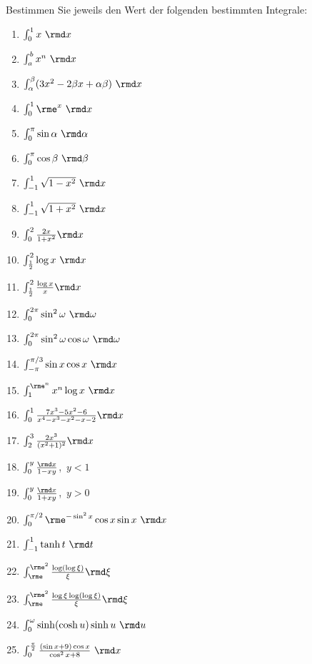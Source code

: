 \documentclass[11pt,answers]{exam}
\begin{document}
\begin{questions}

Bestimmen Sie jeweils den Wert der folgenden bestimmten Integrale:\\
\parbox{0.5\textwidth}{\begin{enumerate}
\item $\int_0^1 x~\rmd x$  
\item $\int_a^b x^n~\rmd x$
\item $\int_\alpha^\beta (3x^2-2\beta x+\alpha\beta)~\rmd x$  
\item $\int_0^1 \rme^x~\rmd x$ 
\item $\int_0^\pi \sin\alpha~\rmd\alpha$  
\item $\int_0^\pi \cos\beta~\rmd\beta$  
\item $\int_{-1}^1\sqrt{1-x^2}~\rmd x$  
\item $\int_{-1}^1\sqrt{1+x^2}~\rmd x$  
\item $\int_0^2 \frac{2x}{1+x^2}\rmd x$  
\item $\int_{\frac{1}{2}}^2\log x~\rmd x$  
\item $\int_{\frac{1}{2}}^2\frac{\log x}{x}\rmd x$  
\item $\int_0^{2\pi}\sin^2\omega~\rmd\omega$  
\item $\int_0^{2\pi}\sin^2\omega\cos\omega~\rmd\omega$  
\end{enumerate}}\parbox{0.5\textwidth}{\begin{enumerate}\setcounter{enumi}{13}
\item $\int_{-\pi}^{\pi/3}\sin x\cos x~\rmd x$  
\item $\int_1^{\rme^n} x^n\log x~\rmd x$  
\item $\int_0^1 \frac{7 x^3-5 x^2-6}{x^4-x^3-x^2-x-2}\rmd x$  
\item $\int_2^3 \frac{2 x^3}{(x^2+1)^2}\rmd x$  
\item $\int_0^y \frac{\rmd x}{1-xy}$,~$y<1$
\item $\int_0^y \frac{\rmd x}{1+xy}$,~$y>0$
\item $\int_0^{\pi/2}\rme^{-\sin^2 x}\cos x\sin x~\rmd x$  
\item $\int_{-1}^1\tanh t~\rmd t$  
\item $\int_\rme^{\rme^2}\frac{\log(\log \xi)}{\xi}\rmd\xi$  
\item $\int_\rme^{\rme^2}\frac{\log\xi \log(\log \xi)}{\xi}\rmd\xi$  
\item $\int_0^\omega \sinh(\cosh u)\sinh u~\rmd u$  
\item $\int_0^{\frac{\pi }{2}} \frac{(\sin x+9) \cos x}{\cos^2 x +8}~\rmd x$  

\end{enumerate}}
\end{questions}
\end{document}
